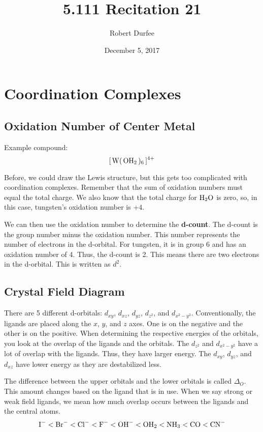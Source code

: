 \documentclass{article}
\title{ 5.111 Recitation 21 }
\author{ Robert Durfee }
\date{ December 5, 2017 }
\begin{document}
\maketitle

\section{ Coordination Complexes }

\subsection{ Oxidation Number of Center Metal }

Example compound:
$$ \ce{ [ W( OH_{2} )_{6} ]^{4+} } $$

Before, we could draw the Lewis structure, but this gets too complicated with
coordination complexes. Remember that the sum of oxidation numbers must equal
the total charge. We also know that the total charge for $\ce{ H_{2}O }$ is
zero, so, in this case, tungsten's oxidation number is $+4$.

We can then use the oxidation number to determine the \textbf{d-count}. The
d-count is the group number minus the oxidation number. This number represents
the number of electrons in the d-orbital. For tungsten, it is in group 6 and has
an oxidation number of 4. Thus, the d-count is 2. This means there are two
electrons in the d-orbital. This is written as $d^{2}$. 

\subsection{ Crystal Field Diagram }

There are 5 different d-orbitals: $d_{xy}$, $d_{xz}$, $d_{yz}$, $d_{z^{2}}$, and
$d_{x^{2}-y^{2}}$. Conventionally, the ligands are placed along the $x$, $y$,
and $z$ axes. One is on the negative and the other is on the positive. When
determining the respective energies of the orbitals, you look at the overlap of
the ligands and the orbitals. The $d_{z^{2}}$ and $d_{x^{2}-y^{2}}$ have a lot
of overlap with the ligands. Thus, they have larger energy. The $d_{xy}$,
$d_{yz}$, and $d_{xz}$ have lower energy as they are destabilized less. 

The difference between the upper orbitals and the lower orbitals is called
$\Delta_{O}$. This amount changes based on the ligand that is in use. When we
say strong or weak field ligands, we mean how much overlap occurs between the
ligands and the central atoms.
$$ \ce{ I- } < \ce{ Br- } < \ce{ Cl- } < \ce{ F- } < \ce{ OH- } < \ce{ OH_{2} }
< \ce{ NH_{3} } < \ce{ CO } < \ce{ CN- }$$
\end{document}
